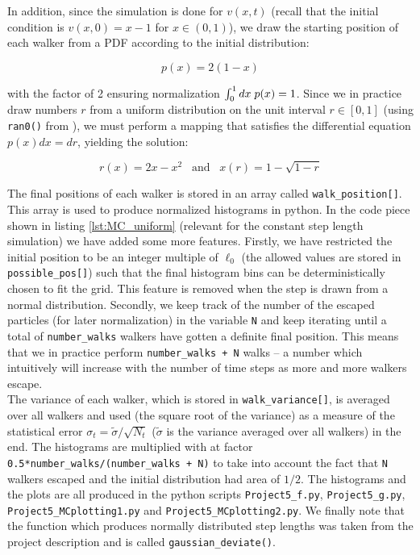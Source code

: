 \documentclass[a4paper, 11pt, notitlepage,english]{article}
\begin{document}
In addition, since the simulation is done for $v(x,t)$ (recall that the initial condition is $v(x,0) = x-1$ for $x\in (0,1)$), we draw the starting position of each walker from a PDF according to the initial distribution:

\begin{equation}
p(x) = 2(1-x)
\label{eq:MC_initial_dist}
\end{equation}

with the factor of 2 ensuring normalization $\int_0^1 dx \hspace{1mm} p(x) = 1$. Since we in practice draw numbers $r$ from a uniform distribution on the unit interval $r \in [0,1]$ (using \texttt{ran0()} from \cite{Komp3150}), we must perform a mapping that satisfies the differential equation $p(x)dx = dr$, yielding the solution:

\begin{equation}
r(x) = 2x-x^2 \hspace{10pt} \mathrm{and} \hspace{10pt} x(r) = 1 - \sqrt{1-r}
\label{eq:MC_prob_mapping}
\end{equation}

The final positions of each walker is stored in an array called \texttt{walk\_position[]}. This array is used to produce normalized histograms in python. In the code piece shown in listing \ref{lst:MC_uniform} (relevant for the constant step length simulation) we have added some more features. Firstly, we have restricted the initial position to be an integer multiple of $\ell_0$ (the allowed values are stored in \texttt{possible\_pos[]}) such that the final histogram bins can be deterministically chosen to fit the grid. This feature is removed when the step is drawn from a normal distribution. Secondly, we keep track of the number of the escaped particles (for later normalization) in the variable \texttt{N} and keep iterating until a total of \texttt{number\_walks} walkers have gotten a definite final position. This means that we in practice perform \texttt{number\_walks + N} walks – a number which intuitively will increase with the number of time steps as more and more walkers escape. \\

The variance of each walker, which is stored in \texttt{walk\_variance[]}, is averaged over all walkers and used (the square root of the variance) as a measure of the statistical error $\sigma_t = \tilde{\sigma}/\sqrt{N_t}$ ($\tilde{\sigma}$ is the variance averaged over all walkers) in the end. The histograms are multiplied with at factor \texttt{0.5*number\_walks/(number\_walks + N)} to take into account the fact that \texttt{N} walkers escaped and the initial distribution had area of $1/2$. The histograms and the plots are all produced in the python scripts \texttt{Project5\_f.py}, \texttt{Project5\_g.py}, \texttt{Project5\_MCplotting1.py} and \texttt{Project5\_MCplotting2.py}. We finally note that the function which produces normally distributed step lengths was taken from the project description \cite{Komp3150} and is called \texttt{gaussian\_deviate()}.  \\
\end{document}
